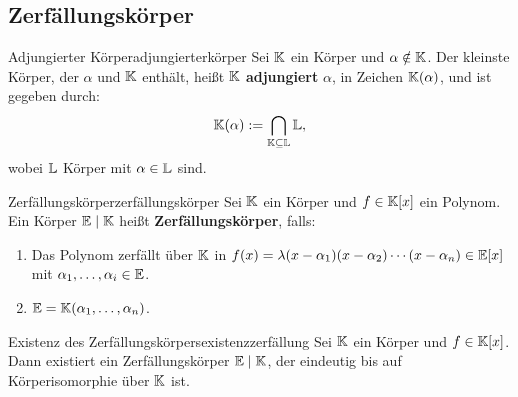 \subsection{Zerfällungskörper}
\label{subsec:zerfaellungskoerper}

\begin{definition}{Adjungierter Körper}{adjungierterkörper}
Sei $\mathbb{K}$ ein Körper und $\alpha \notin \mathbb{K}$. Der kleinste Körper, der $\alpha$ und $\mathbb{K}$ enthält, heißt $\mathbb{K}$ \textbf{adjungiert} $\alpha$, in Zeichen $\mathbb{K}(\alpha)$, und ist gegeben durch:
\begin{equation}
\mathbb{K}(\alpha) := \bigcap_{\mathbb{K} \subseteq \mathbb{L}} \mathbb{L},
\end{equation}
wobei $\mathbb{L}$ Körper mit $\alpha \in \mathbb{L}$ sind.
\end{definition}

\begin{definition}{Zerfällungskörper}{zerfällungskörper}
Sei $\mathbb{K}$ ein Körper und $f \in \mathbb{K}[x]$ ein Polynom. Ein Körper $\mathbb{E} \mid \mathbb{K}$ heißt \textbf{Zerfällungskörper}, falls:
\begin{enumerate}
\item Das Polynom zerfällt über $\mathbb{K}$ in $f(x) = \lambda (x-\alpha_1)(x-\alpha_2)\cdots (x-\alpha_n) \in \mathbb{E}[x]$ mit $\alpha_1, \dots, \alpha_i \in \mathbb{E}$.
\item $\mathbb{E} = \mathbb{K}(\alpha_1, \dots, \alpha_n)$.
\end{enumerate}
\end{definition}
\begin{satz}{Existenz des Zerfällungskörpers}{existenzzerfällung}
Sei $\mathbb{K}$ ein Körper und $f \in \mathbb{K}[x]$. Dann existiert ein Zerfällungskörper $\mathbb{E} \mid \mathbb{K}$, der eindeutig bis auf Körperisomorphie über $\mathbb{K}$ ist.
\end{satz}
